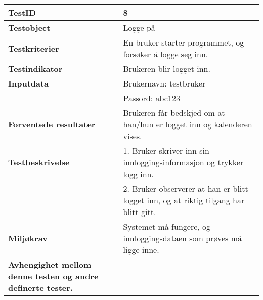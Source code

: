 	\begin{tabularx}{1.2\textwidth}{| p{5cm} | X |}
	\hline
	\textbf{TestID} 																& 8																	\\ \hline
	\textbf{Testobject} 															& Logge på															\\ \hline
	\textbf{Testkriterier} 															& En bruker starter programmet, og forsøker å logge seg inn.							\\ \hline
	\textbf{Testindikator} 															& Brukeren blir logget inn.													\\ \hline
	\textbf{Inputdata} 															& Brukernavn: testbruker													\\ 
																			& Passord: abc123														\\  \hline
	\textbf{Forventede resultater}									 				& Brukeren får bedskjed om at han/hun er logget inn og kalenderen vises.				\\ \hline
	\textbf{Testbeskrivelse} 														& 1. Bruker skriver inn sin innloggingsinformasjon og trykker logg inn.					\\
																			& 2. Bruker observerer at han er blitt logget inn, og at riktig tilgang har blitt gitt.					\\ \hline
	\textbf{Miljøkrav}			 												& Systemet må fungere, og innloggingsdataen som prøves må ligge inne.						\\ \hline
	\textbf{Avhengighet mellom denne testen og andre definerte tester.}		 				&				 													\\ \hline
	\end{tabularx}

\mbox{}\\

